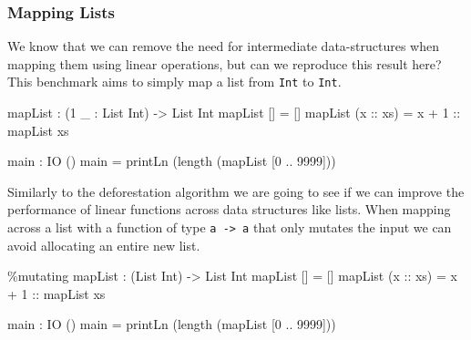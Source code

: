 \documentclass[
]{article}
\newenvironment{Shaded}{}{}
\newcommand{\DataTypeTok}[1]{\textcolor[rgb]{0.56,0.13,0.00}{#1}}
\newcommand{\DecValTok}[1]{\textcolor[rgb]{0.25,0.63,0.44}{#1}}
\newcommand{\FunctionTok}[1]{\textcolor[rgb]{0.02,0.16,0.49}{#1}}
\newcommand{\NormalTok}[1]{#1}
\newcommand{\OperatorTok}[1]{\textcolor[rgb]{0.40,0.40,0.40}{#1}}
\newcommand{\OtherTok}[1]{\textcolor[rgb]{0.00,0.44,0.13}{#1}}
\begin{document}
\hypertarget{mapping-lists}{%
\subsubsection{Mapping Lists}\label{mapping-lists}}

We know that we can remove the need for intermediate data-structures
when mapping them using linear operations\cite{deforestation}, but can
we reproduce this result here? This benchmark aims to simply map a list
from \texttt{Int} to \texttt{Int}.

\begin{Shaded}
\begin{Highlighting}[]
\NormalTok{mapList }\OperatorTok{:}\NormalTok{ (}\DecValTok{1}\NormalTok{ \_ }\OperatorTok{:} \DataTypeTok{List} \DataTypeTok{Int}\NormalTok{) }\OtherTok{{-}\textgreater{}} \DataTypeTok{List} \DataTypeTok{Int}
\NormalTok{mapList [] }\OtherTok{=}\NormalTok{ []}
\NormalTok{mapList (}\OtherTok{x ::}\NormalTok{ xs) }\OtherTok{=}\NormalTok{ x }\OperatorTok{+} \DecValTok{1}\OtherTok{ ::}\NormalTok{ mapList xs}

\NormalTok{main }\OperatorTok{:} \DataTypeTok{IO}\NormalTok{ ()}
\NormalTok{main }\OtherTok{=}\NormalTok{ printLn (}\FunctionTok{length}\NormalTok{ (mapList [}\DecValTok{0} \OperatorTok{..} \DecValTok{9999}\NormalTok{]))}
\end{Highlighting}
\end{Shaded}

Similarly to the deforestation algorithm we are going to see if we can
improve the performance of linear functions across data structures like
lists. When mapping across a list with a function of type
\texttt{a\ -\textgreater{}\ a} that only mutates the input we can avoid
allocating an entire new list.

\begin{Shaded}
\begin{Highlighting}[]
\OperatorTok{\%}\NormalTok{mutating}
\NormalTok{mapList }\OperatorTok{:}\NormalTok{ (}\DataTypeTok{List} \DataTypeTok{Int}\NormalTok{) }\OtherTok{{-}\textgreater{}} \DataTypeTok{List} \DataTypeTok{Int}
\NormalTok{mapList [] }\OtherTok{=}\NormalTok{ []}
\NormalTok{mapList (}\OtherTok{x ::}\NormalTok{ xs) }\OtherTok{=}\NormalTok{ x }\OperatorTok{+} \DecValTok{1}\OtherTok{ ::}\NormalTok{ mapList xs}

\NormalTok{main }\OperatorTok{:} \DataTypeTok{IO}\NormalTok{ ()}
\NormalTok{main }\OtherTok{=}\NormalTok{ printLn (}\FunctionTok{length}\NormalTok{ (mapList [}\DecValTok{0} \OperatorTok{..} \DecValTok{9999}\NormalTok{]))}
\end{Highlighting}
\end{Shaded}
\end{document}
